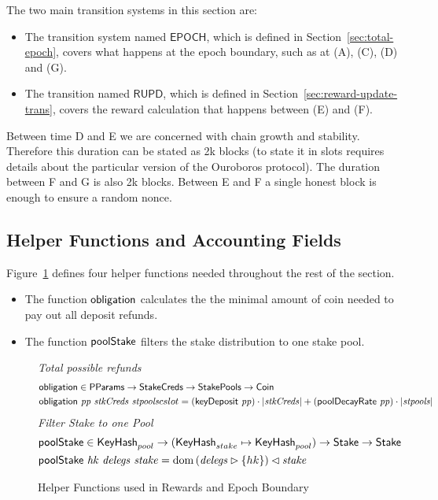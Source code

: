 The two main transition systems in this section are:
\begin{itemize}
  \item The transition system named $\mathsf{EPOCH}$, which is defined in
    Section~\ref{sec:total-epoch}, covers what happens at the epoch boundary,
    such as at (A), (C), (D) and (G).
  \item The transition named $\mathsf{RUPD}$, which is defined in
    Section~\ref{sec:reward-update-trans}, covers the reward calculation that
    happens between (E) and (F).
\end{itemize}


\begin{note}
  Between time D and E we are concerned with chain growth and stability.
  Therefore this duration can be stated as 2k blocks (to state it in slots requires details about
  the particular version of the Ouroboros protocol). The duration between F and G is also 2k blocks.
  Between E and F a single honest block is enough to ensure a random nonce.
\end{note}

\subsection{Helper Functions and Accounting Fields}
\label{sec:stake-dist-helpers}

Figure~\ref{fig:funcs:epoch-helper-rewards} defines four helper functions needed
throughout the rest of the section.

\begin{itemize}
  \item The function $\mathsf{obligation}$ calculates the the minimal amount of coin needed to
    pay out all deposit refunds.
  \item The function $\mathsf{poolStake}$ filters the stake distribution to one stake pool.
\end{itemize}


\begin{figure}[htb]
  \emph{Total possible refunds}
  \begin{align*}
    & \mathsf{obligation} \in \mathsf{PParams} \to \mathsf{StakeCreds} \to \mathsf{StakePools} \to \mathsf{Coin} \\
    & \mathsf{obligation}~ \mathit{pp}~ \mathit{stkCreds}~ \mathit{stpools}{cslot} =
      (\mathsf{keyDeposit}~\mathit{pp}) \cdot|\mathit{stkCreds}| +
      (\mathsf{poolDecayRate}~\mathit{pp}) \cdot|\mathit{stpools}| \\
  \end{align*}
  \emph{Filter Stake to one Pool}
  \begin{align*}
      & \mathsf{poolStake} \in \mathsf{KeyHash}_{pool} \to (\mathsf{KeyHash}_{stake} \mapsto \mathsf{KeyHash}_{pool})
        \to \mathsf{Stake} \to \mathsf{Stake} \\
      & \mathsf{poolStake}~ \mathit{hk}~ \mathit{delegs}~ \mathit{stake} =
        \operatorname{dom}{(\mathit{delegs}\rhd\{hk\})\lhd\mathit{stake}}
  \end{align*}

  \caption{Helper Functions used in Rewards and Epoch Boundary}
  \label{fig:funcs:epoch-helper-rewards}
\end{figure}


